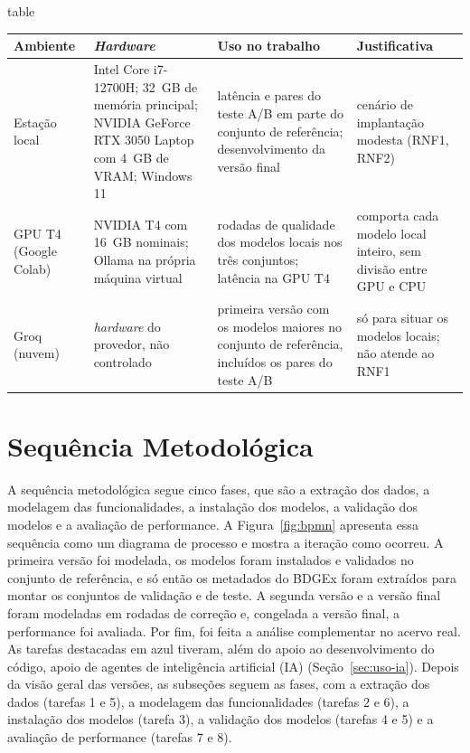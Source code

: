\begin{fixo}{table}
\centering
\caption{Ambientes de execução e uso de cada um}
\label{tab:ambientes}
\footnotesize
\begin{tabular}{|>{\raggedright\arraybackslash}p{2.3cm}|>{\raggedright\arraybackslash}p{3.9cm}|>{\raggedright\arraybackslash}p{4.0cm}|>{\raggedright\arraybackslash}p{4.0cm}|}
\hline
\textbf{Ambiente} & \textbf{\textit{Hardware}} & \textbf{Uso no trabalho} & \textbf{Justificativa} \\ \hline
Estação local & Intel Core i7-12700H; 32~GB de memória principal; NVIDIA GeForce RTX 3050 Laptop com 4~GB de VRAM; Windows 11 & latência e pares do teste A/B em parte do conjunto de referência; desenvolvimento da versão final & cenário de implantação modesta (RNF1, RNF2) \\ \hline
GPU T4 (Google Colab) & NVIDIA T4 com 16~GB nominais; Ollama na própria máquina virtual & rodadas de qualidade dos modelos locais nos três conjuntos; latência na GPU T4 & comporta cada modelo local inteiro, sem divisão entre GPU e CPU \\ \hline
Groq (nuvem) & \textit{hardware} do provedor, não controlado & primeira versão com os modelos maiores no conjunto de referência, incluídos os pares do teste A/B & só para situar os modelos locais; não atende ao RNF1 \\ \hline
\end{tabular}
\end{fixo}

\section{Sequência Metodológica}
\label{sec:sequencia}

A sequência metodológica segue cinco fases, que são a extração dos dados, a modelagem das funcionalidades, a instalação dos modelos, a validação dos modelos e a avaliação de performance. A Figura~\ref{fig:bpmn} apresenta essa sequência como um diagrama de processo e mostra a iteração como ocorreu. A primeira versão foi modelada, os modelos foram instalados e validados no conjunto de referência, e só então os metadados do BDGEx foram extraídos para montar os conjuntos de validação e de teste. A segunda versão e a versão final foram modeladas em rodadas de correção e, congelada a versão final, a performance foi avaliada. Por fim, foi feita a análise complementar no acervo real. As tarefas destacadas em azul tiveram, além do apoio ao desenvolvimento do código, apoio de agentes de inteligência artificial (IA) (Seção~\ref{sec:uso-ia}). Depois da visão geral das versões, as subseções seguem as fases, com a extração dos dados (tarefas 1 e 5), a modelagem das funcionalidades (tarefas 2 e 6), a instalação dos modelos (tarefa 3), a validação dos modelos (tarefas 4 e 5) e a avaliação de performance (tarefas 7 e 8).

